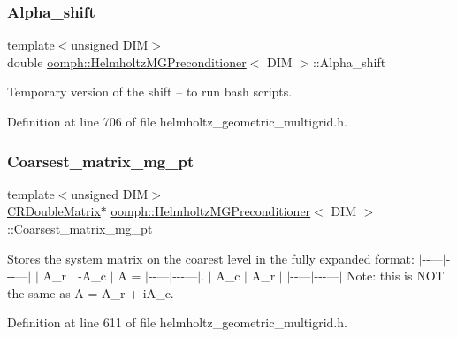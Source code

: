 \subsubsection{\texorpdfstring{Alpha\+\_\+shift}{Alpha\_shift}}
{\footnotesize\ttfamily template$<$unsigned D\+IM$>$ \\
double \hyperlink{classoomph_1_1HelmholtzMGPreconditioner}{oomph\+::\+Helmholtz\+M\+G\+Preconditioner}$<$ D\+IM $>$\+::Alpha\+\_\+shift\hspace{0.3cm}{\ttfamily [private]}}



Temporary version of the shift -- to run bash scripts. 



Definition at line 706 of file helmholtz\+\_\+geometric\+\_\+multigrid.\+h.

\mbox{\label{classoomph_1_1HelmholtzMGPreconditioner_a3258a6f09f4c4378cd6619f194e5d24b}} 
\subsubsection{\texorpdfstring{Coarsest\+\_\+matrix\+\_\+mg\+\_\+pt}{Coarsest\_matrix\_mg\_pt}}
{\footnotesize\ttfamily template$<$unsigned D\+IM$>$ \\
\hyperlink{classoomph_1_1CRDoubleMatrix}{C\+R\+Double\+Matrix}$\ast$ \hyperlink{classoomph_1_1HelmholtzMGPreconditioner}{oomph\+::\+Helmholtz\+M\+G\+Preconditioner}$<$ D\+IM $>$\+::Coarsest\+\_\+matrix\+\_\+mg\+\_\+pt\hspace{0.3cm}{\ttfamily [private]}}



Stores the system matrix on the coarest level in the fully expanded format\+: $\vert$-\/-\/---$\vert$-\/-\/-\/---$\vert$ $\vert$ A\+\_\+r $\vert$ -\/\+A\+\_\+c $\vert$ A = $\vert$-\/-\/---$\vert$-\/-\/-\/---$\vert$. $\vert$ A\+\_\+c $\vert$ A\+\_\+r $\vert$ $\vert$-\/-\/---$\vert$-\/-\/-\/---$\vert$ Note\+: this is N\+OT the same as A = A\+\_\+r + i\+A\+\_\+c. 



Definition at line 611 of file helmholtz\+\_\+geometric\+\_\+multigrid.\+h.

